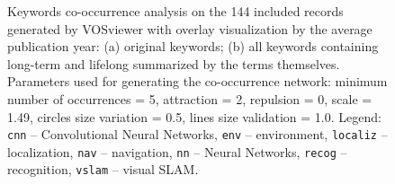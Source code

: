 \begin{figure}[!t]
  \centering
  \hfill
  \caption{Keywords co-occurrence analysis on the 144 included records generated by VOSviewer with overlay visualization by the average publication year: (a) original keywords; (b) all keywords containing long-term and lifelong summarized by the terms themselves. Parameters used for generating the co-occurrence network: minimum number of occurrences = 5, attraction = 2, repulsion = 0, scale = 1.49, circles size variation = 0.5, lines size validation = 1.0. Legend: \texttt{cnn} -- Convolutional Neural Networks, \texttt{env} -- environment, \texttt{localiz} -- localization, \texttt{nav} -- navigation, \texttt{nn} -- Neural Networks, \texttt{recog} -- recognition, \texttt{vslam} -- visual SLAM.}
  \label{fig:overview:kw}
\end{figure}

